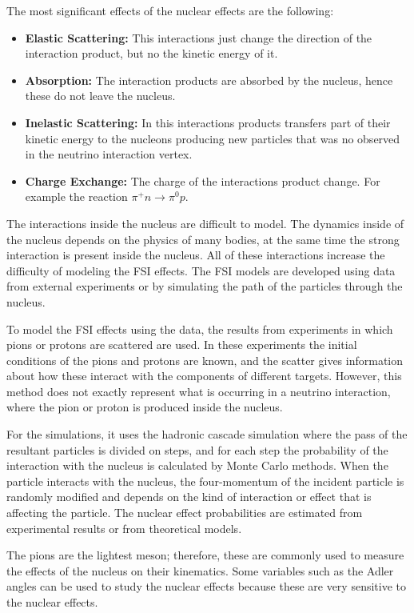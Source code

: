 The most significant effects of the nuclear effects are the following:

\begin{itemize}
    \item \textbf{Elastic Scattering:} This interactions just change the direction of the interaction product, but no the kinetic energy of it.  
    \item \textbf{Absorption:} The interaction products are absorbed by the nucleus, hence these do not leave the nucleus.
    \item \textbf{Inelastic Scattering:} In this interactions products transfers part of their kinetic energy to the nucleons producing new particles that was no observed in the neutrino interaction vertex. 
    \item \textbf{Charge Exchange:} The charge of the interactions product change. For example the reaction $\pi^+ n \rightarrow \pi^0 p$.
\end{itemize}

The interactions inside the nucleus are difficult to model. The dynamics inside of the nucleus depends on the physics of many bodies, at the same time the strong interaction is present inside the nucleus. All of these interactions increase the difficulty of modeling the FSI effects. The FSI models are developed using data from external experiments or by simulating the path of the particles through the nucleus.

To model the FSI effects using the data, the results from experiments in which pions or protons are scattered are used. In these experiments the initial conditions of the pions and protons are known, and the scatter gives information about how these interact with the components of different targets. However, this method does not exactly represent what is occurring in a neutrino interaction, where the pion or proton is produced inside the nucleus.

For the simulations, it uses the hadronic cascade simulation where the pass of the resultant particles is divided on steps, and for each step the probability of the interaction with the nucleus is calculated by Monte Carlo methods. When the particle interacts with the nucleus, the four-momentum of the incident particle is randomly modified and depends on the kind of interaction or effect that is affecting the particle. The nuclear effect probabilities are estimated from experimental results or from theoretical models.

The pions are the lightest meson; therefore, these are commonly used to measure the effects of the nucleus on their kinematics. Some variables such as the Adler angles\cite{S_nchez_2016} can be used to study the nuclear effects because these are very sensitive to the nuclear effects.

